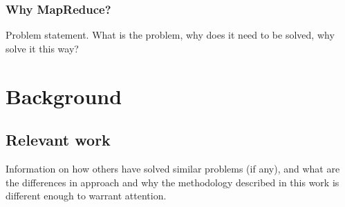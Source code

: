 \documentclass [12pt,a4paper]{report}
\begin{document}
\subsection{Why MapReduce?}

Problem statement. What is the problem, why does it need to be solved, why solve it this way?

\chapter{Background}

\section{Relevant work}
Information on how others have solved similar problems (if any), and what are the differences in approach and why the methodology described in this work is different enough to warrant attention.
\end{document}
